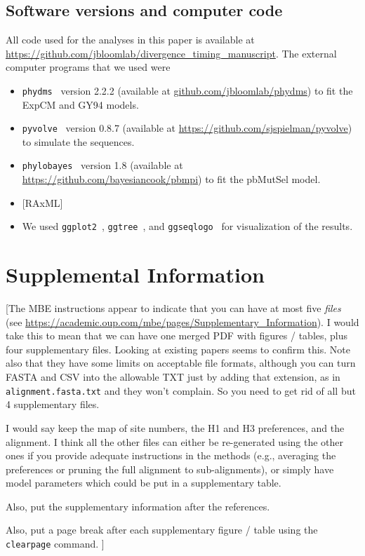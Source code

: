\documentclass[11pt]{article}
\newcommand\jdbcomment[1]{{\color{red}[#1]}}
\begin{document}
\subsection*{Software versions and computer code}
All code used for the analyses in this paper is available at \url{https://github.com/jbloomlab/divergence_timing_manuscript}. 
The external computer programs that we used were
\begin{itemize} 
\item \texttt{phydms}~\citep{hilton2017phydms} version 2.2.2 (available at \url{github.com/jbloomlab/phydms}) to fit the ExpCM and GY94 models.
\item \texttt{pyvolve}~\citep{spielman2015pyvolve} version 0.8.7 (available at \url{https://github.com/sjspielman/pyvolve}) to simulate the sequences.
\item \texttt{phylobayes}~\citep{rodrigue2014site} version 1.8 (available at \url{https://github.com/bayesiancook/pbmpi}) to fit the pbMutSel model. 
\item \jdbcomment{RAxML}
\item We used \texttt{ggplot2}~\citep{wickham2016ggplot2}, \texttt{ggtree}~\citep{yu2017ggtree}, and \texttt{ggseqlogo}~\citep{wagih2017ggseqlogo} for visualization of the results.
\end{itemize}



\newpage
\section*{Supplemental Information}

\jdbcomment{The MBE instructions appear to indicate that you can have at most five \emph{files} (see \url{https://academic.oup.com/mbe/pages/Supplementary_Information}). 
I would take this to mean that we can have one merged PDF with figures / tables, plus four supplementary files.
Looking at existing papers seems to confirm this.
Note also that they have some limits on acceptable file formats, although you can turn FASTA and CSV into the allowable TXT just by adding that extension, as in \texttt{alignment.fasta.txt} and they won't complain.
So you need to get rid of all but 4 supplementary files. 

I would say keep the map of site numbers, the H1 and H3 preferences, and the alignment. 
I think all the other files can either be re-generated using the other ones if you provide adequate instructions in the methods (e.g., averaging the preferences or pruning the full alignment to sub-alignments), or simply have model parameters which could be put in a supplementary table.

Also, put the supplementary information after the references.

Also, put a page break after each supplementary figure / table using the \texttt{clearpage} command.
}
\end{document}
